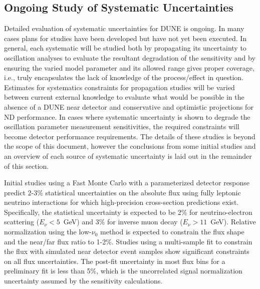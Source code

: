 \subsection{Ongoing Study of Systematic Uncertainties}
\label{sec:syst_studies_ind}
Detailed evaluation of systematic uncertainties for DUNE is ongoing. In many cases plans for studies
have been developed but have not yet been executed. In general, each systematic will be studied both by
propagating its uncertainty to oscillation analyses to evaluate the resultant degradation of the sensitivity
and by ensuring the varied model parameter and its allowed range gives proper coverage, i.e., truly encapsulates
the lack of knowledge of the process/effect in question. Estimates for systematics constraints for
propagation studies will be varied between current external knowledge to evaluate what would be possible in the
absence of a DUNE near detector and conservative and optimistic projections
for ND performance. In cases where systematic uncertainty is shown to degrade the oscillation parameter
measurement sensitivities, the required constraints will become detector performance requirements.
The details of these studies is beyond the scope of this document, however the conclusions from some
initial studies and an overview of each source of systematic uncertainty is laid out in the remainder of this section.

Initial studies using a Fast Monte Carlo with a parameterized detector response
predict 2-3\% statistical uncertainties on the absolute flux using fully 
leptonic neutrino interactions for which high-precision cross-section predictions 
exist. Specifically,
the statistical uncertainty is expected to be 2\% for neutrino-electron
scattering ($E_\nu<5$~GeV) and 3\% for inverse muon decay ($E_\nu>11$~GeV).
Relative normalization using the low-$\nu_0$ method is
expected to constrain the flux shape and the near/far flux ratio to 1-2\%.
Studies using a multi-sample fit  to constrain the flux with simulated near detector
event samples show significant constraints on all flux
uncertainties. The post-fit uncertainty 
in most flux bins for a preliminary fit is less
than 5\%, which is the uncorrelated \numu signal normalization
uncertainty assumed by the sensitivity calculations. 

